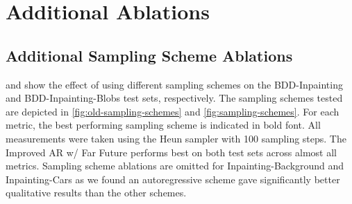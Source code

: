 \chapter{Additional Ablations}
\section{Additional Sampling Scheme Ablations}
 and  show the effect of using different sampling schemes on the BDD-Inpainting and BDD-Inpainting-Blobs test sets, respectively. The sampling schemes tested are depicted in \cref{fig:old-sampling-schemes} and \cref{fig:sampling-schemes}. For each metric, the best performing sampling scheme is indicated in bold font. All measurements were taken using the Heun sampler \citep{karras2022elucidating} with 100 sampling steps. The Improved AR w/ Far Future performs best on both test sets across almost all metrics. Sampling scheme ablations are omitted for Inpainting-Background and Inpainting-Cars as we found an autoregressive scheme gave significantly better qualitative results than the other schemes.
\begin{table}[h]
\centering
\caption{Effect of sampling schemes measured on the BDD-Inpainting test set.}
\label{table:samplingschemesnotblobs}
\end{table}
